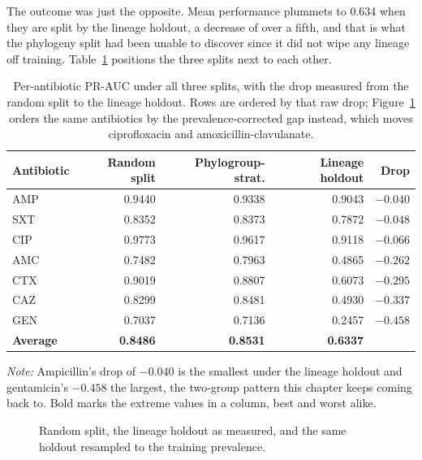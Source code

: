 The outcome was just the opposite. Mean performance plummets to 0.634 when they
are split by the lineage holdout, a decrease of over a fifth, and that is what the
phylogeny split had been unable to discover since it did not wipe any lineage off
training. Table~\ref{tab:mlst_per_ab} positions the three splits next to each
other.

\FloatBarrier
\begin{table}[htb]
\centering
\caption{Per-antibiotic PR-AUC under all three splits, with the drop measured from
the random split to the lineage holdout. Rows are ordered by that raw drop;
Figure~\ref{fig:lineage_drop} orders the same antibiotics by the
prevalence-corrected gap instead, which moves ciprofloxacin and
amoxicillin-clavulanate.}
\label{tab:mlst_per_ab}
\small
\begin{tabular}{|l|r|r|r|r|}
\hline
\textbf{Antibiotic} & \textbf{Random split} & \textbf{Phylogroup-strat.} & \textbf{Lineage holdout} & \textbf{Drop} \\ \hline
AMP & 0.9440 & 0.9338 & 0.9043 & $\mathbf{-0.040}$ \\ \hline
SXT & 0.8352 & 0.8373 & 0.7872 & $-0.048$ \\ \hline
CIP & 0.9773 & 0.9617 & 0.9118 & $-0.066$ \\ \hline
AMC & 0.7482 & 0.7963 & 0.4865 & $-0.262$ \\ \hline
CTX & 0.9019 & 0.8807 & 0.6073 & $-0.295$ \\ \hline
CAZ & 0.8299 & 0.8481 & 0.4930 & $-0.337$ \\ \hline
GEN & 0.7037 & 0.7136 & 0.2457 & $\mathbf{-0.458}$ \\ \hline
\textbf{Average} & \textbf{0.8486} & \textbf{0.8531} & \textbf{0.6337} & \\ \hline
\end{tabular}
\vspace{0.4em}

\noindent\footnotesize\textit{Note:} Ampicillin's drop of $-0.040$ is the smallest under the
lineage holdout and gentamicin's $-0.458$ the largest, the two-group pattern this chapter keeps
coming back to. Bold marks the extreme values in a column, best and worst alike.
\end{table}

\begin{figure}[htb]
  \centering
  \resizebox{\textwidth}{!}{}
  \caption{Random split, the lineage holdout as measured, and the same holdout
  resampled to the training prevalence.}
  \label{fig:lineage_drop}
\end{figure}

